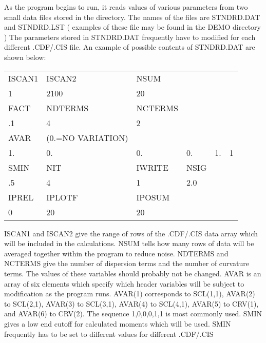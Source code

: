       As the program begins to run, it reads values of various parameters
   from two small data files stored in the directory.
   The names of the files are STNDRD.DAT and STNDRD.LST ( examples of 
   these file may be found in the DEMO directory ) 
   The parameters
   stored in STNDRD.DAT frequently have to modified for each different
   .CDF/.CIS file.  An example of possible contents of STNDRD.DAT are
   shown below:
\begin{center}
\begin{tabular}{||l l l l l l ||}   
\hline
           ISCAN1  &   ISCAN2 &   NSUM  &     &        &  \\            
           1       &   2100   &   20    &     &        &  \\           
           FACT    &   NDTERMS &  NCTERMS &   &        &  \\           
           .1      &   4       &  2       &   &        &  \\           
           AVAR & (0.=NO VARIATION) &     &   &        &  \\           
           1.   &     0.  &      0. &       0.  &      1.   &  1 \\
           SMIN &      NIT &      IWRITE &  NSIG  &      &  \\         
           .5   &      4   &      1    &    2.0   &      &  \\         
           IPREL  &    IPLOTF &   IPOSUM  &       &      &  \\         
           0    &      20    &    20   &          &      &  \\         
\hline
\end{tabular}   
\end{center}
      ISCAN1 and ISCAN2 give the range of rows of the .CDF/.CIS data array
   which will be included in the calculations.  NSUM tells how many rows
   of data will be averaged together within the program to reduce noise.
   NDTERMS and NCTERMS give the number of dispersion terms and the number
   of curvature terms.  The values of these variables should probably not
   be changed.  AVAR is an array of six elements which specify which
   header variables will be subject to modification as the program runs.
   AVAR(1) corresponds to SCL(1,1), AVAR(2) to SCL(2,1), AVAR(3) to
   SCL(3,1), AVAR(4) to SCL(4,1), AVAR(5) to CRV(1), and AVAR(6) to
   CRV(2). The sequence {1,0,0,0,1,1} is most commonly used. SMIN gives a
   low end cutoff for calculated moments which will be used. SMIN
   frequently has to be set to different values for different .CDF/.CIS
